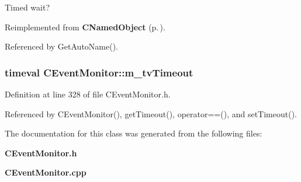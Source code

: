 Timed wait? 

Reimplemented from {\bf CNamed\-Object} {\rm (p.\,\pageref{classCNamedObject_r0})}.

Referenced by Get\-Auto\-Name().
\subsubsection{\setlength{\rightskip}{0pt plus 5cm}timeval CEvent\-Monitor::m\_\-tv\-Timeout\hspace{0.3cm}{\tt  [private]}}\label{classCEventMonitor_o0}




Definition at line 328 of file CEvent\-Monitor.h.

Referenced by CEvent\-Monitor(), get\-Timeout(), operator==(), and set\-Timeout().

The documentation for this class was generated from the following files:\begin{CompactItemize}
\item 
{\bf CEvent\-Monitor.h}\item 
{\bf CEvent\-Monitor.cpp}\end{CompactItemize}
